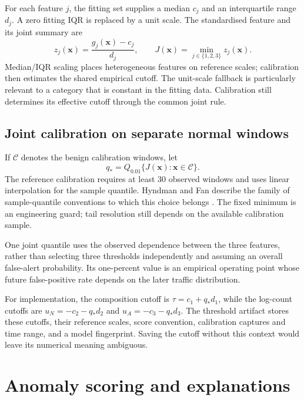 For each feature $j$, the fitting set supplies a median $c_j$ and an
interquartile range $d_j$. A zero fitting IQR is replaced by a unit scale.
The standardised feature and its joint summary are
\begin{equation}
 z_j(\boldsymbol{x})=\frac{g_j(\boldsymbol{x})-c_j}{d_j},
 \qquad J(\boldsymbol{x})=\min_{j\in\{1,2,3\}}z_j(\boldsymbol{x}).
\label{eq:joint-feature}
\end{equation}
Median/IQR scaling places heterogeneous features on reference scales;
calibration then estimates the shared empirical cutoff.
The unit-scale fallback is particularly relevant to a category that is
constant in the fitting data. Calibration still determines its effective
cutoff through the common joint rule.

\subsection{Joint calibration on separate normal windows}

If $\mathcal C$ denotes the benign calibration windows, let
\begin{equation}
 q_*=Q_{0.01}\{J(\boldsymbol{x}):\boldsymbol{x}\in\mathcal C\}.
\label{eq:joint-quantile}
\end{equation}
The reference calibration requires at least 30 observed windows and uses
linear interpolation for the sample quantile. Hyndman and Fan describe
the family of sample-quantile conventions to which this choice belongs
\cite{hyndman1996}. The fixed minimum is an engineering guard; tail
resolution still depends on the available calibration sample.

One joint quantile uses the observed dependence between the three
features, rather than selecting three thresholds independently and
assuming an overall false-alert probability. Its one-percent value is
an empirical operating point whose future false-positive rate depends on
the later traffic distribution.

For implementation, the composition cutoff is
$\tau=c_1+q_*d_1$, while the log-count cutoffs are
$u_N=-c_2-q_*d_2$ and $u_A=-c_3-q_*d_3$. The threshold artifact stores
these cutoffs, their reference scales, score convention, calibration
captures and time range, and a model fingerprint. Saving the cutoff
without this context would leave its numerical meaning ambiguous.

\section{Anomaly scoring and explanations}
\label{sec:joint-scoring}

